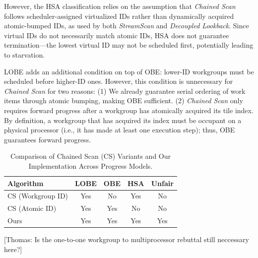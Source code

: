 \documentclass[sigconf]{acmart}
\newcommand{\thomas}[1]{{\footnotesize\color{orange}[Thomas: #1]}}
\begin{document}
However, the HSA classification relies on the assumption that \emph{Chained Scan} follows scheduler-assigned virtualized IDs rather than dynamically acquired atomic-bumped IDs, as used by both \emph{StreamScan} and \emph{Decoupled Lookback}. Since virtual IDs do not necessarily match atomic IDs, HSA does not guarantee termination---the lowest virtual ID may not be scheduled first, potentially leading to starvation.

LOBE adds an additional condition on top of OBE: lower-ID workgroups must be scheduled before higher-ID ones. However, this condition is unnecessary for \emph{Chained Scan} for two reasons: (1) We already guarantee serial ordering of work items through atomic bumping, making OBE sufficient. (2) \emph{Chained Scan} only requires forward progress after a workgroup has atomically acquired its tile index. By definition, a workgroup that has acquired its index must be occupant on a physical processor (i.e., it has made at least one execution step); thus, OBE guarantees forward progress.
 
\begin{table}
  \small
  \centering
  \begin{tabular}{lcccc}
    \toprule
    Algorithm       & LOBE & OBE & HSA & Unfair \\
    \midrule
    CS (Workgroup ID)  & Yes & No  & Yes & No  \\
    CS (Atomic ID)        & Yes & Yes & No  & No  \\
    Ours               & Yes & Yes & Yes & Yes \\
    \bottomrule
  \end{tabular}
  \caption{Comparison of Chained Scan (CS) Variants and Our Implementation Across Progress Models.}
  \label{tab:progress_models}
\end{table}

\thomas{Is the one-to-one workgroup to multiprocessor rebuttal still neccessary here?}
\end{document}

